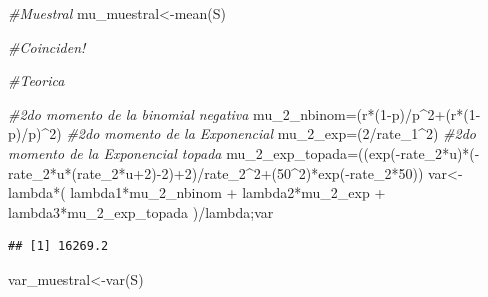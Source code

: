 \documentclass[
]{article}
\newenvironment{Shaded}{\begin{snugshade}}{\end{snugshade}}
\newcommand{\CommentTok}[1]{\textcolor[rgb]{0.56,0.35,0.01}{\textit{#1}}}
\newcommand{\DecValTok}[1]{\textcolor[rgb]{0.00,0.00,0.81}{#1}}
\newcommand{\FunctionTok}[1]{\textcolor[rgb]{0.00,0.00,0.00}{#1}}
\newcommand{\NormalTok}[1]{#1}
\newcommand{\OtherTok}[1]{\textcolor[rgb]{0.56,0.35,0.01}{#1}}
\newcommand{\SpecialCharTok}[1]{\textcolor[rgb]{0.00,0.00,0.00}{#1}}
\begin{document}
\begin{Shaded}
\begin{Highlighting}[]
\CommentTok{\#Muestral}
\NormalTok{mu\_muestral}\OtherTok{\textless{}{-}}\FunctionTok{mean}\NormalTok{(S)}

\CommentTok{\#Coinciden!}

\CommentTok{\#Teorica }

\CommentTok{\#2do momento de la binomial negativa}
\NormalTok{mu\_2\_nbinom}\OtherTok{=}\NormalTok{(r}\SpecialCharTok{*}\NormalTok{(}\DecValTok{1}\SpecialCharTok{{-}}\NormalTok{p)}\SpecialCharTok{/}\NormalTok{p}\SpecialCharTok{\^{}}\DecValTok{2}\SpecialCharTok{+}\NormalTok{(r}\SpecialCharTok{*}\NormalTok{(}\DecValTok{1}\SpecialCharTok{{-}}\NormalTok{p)}\SpecialCharTok{/}\NormalTok{p)}\SpecialCharTok{\^{}}\DecValTok{2}\NormalTok{)}
\CommentTok{\#2do momento de la Exponencial}
\NormalTok{mu\_2\_exp}\OtherTok{=}\NormalTok{(}\DecValTok{2}\SpecialCharTok{/}\NormalTok{rate\_1}\SpecialCharTok{\^{}}\DecValTok{2}\NormalTok{)}
\CommentTok{\#2do momento de la Exponencial topada}
\NormalTok{mu\_2\_exp\_topada}\OtherTok{=}\NormalTok{((}\FunctionTok{exp}\NormalTok{(}\SpecialCharTok{{-}}\NormalTok{rate\_2}\SpecialCharTok{*}\NormalTok{u)}\SpecialCharTok{*}\NormalTok{(}\SpecialCharTok{{-}}\NormalTok{rate\_2}\SpecialCharTok{*}\NormalTok{u}\SpecialCharTok{*}\NormalTok{(rate\_2}\SpecialCharTok{*}\NormalTok{u}\SpecialCharTok{+}\DecValTok{2}\NormalTok{)}\SpecialCharTok{{-}}\DecValTok{2}\NormalTok{)}\SpecialCharTok{+}\DecValTok{2}\NormalTok{)}\SpecialCharTok{/}\NormalTok{rate\_2}\SpecialCharTok{\^{}}\DecValTok{2}\SpecialCharTok{+}\NormalTok{(}\DecValTok{50}\SpecialCharTok{\^{}}\DecValTok{2}\NormalTok{)}\SpecialCharTok{*}\FunctionTok{exp}\NormalTok{(}\SpecialCharTok{{-}}\NormalTok{rate\_2}\SpecialCharTok{*}\DecValTok{50}\NormalTok{))}
\NormalTok{var}\OtherTok{\textless{}{-}}\NormalTok{lambda}\SpecialCharTok{*}\NormalTok{(}
\NormalTok{        lambda1}\SpecialCharTok{*}\NormalTok{mu\_2\_nbinom }\SpecialCharTok{+} 
\NormalTok{        lambda2}\SpecialCharTok{*}\NormalTok{mu\_2\_exp }\SpecialCharTok{+}
\NormalTok{        lambda3}\SpecialCharTok{*}\NormalTok{mu\_2\_exp\_topada}
\NormalTok{        )}\SpecialCharTok{/}\NormalTok{lambda;var}
\end{Highlighting}
\end{Shaded}

\begin{verbatim}
## [1] 16269.2
\end{verbatim}

\begin{Shaded}
\begin{Highlighting}[]
\NormalTok{var\_muestral}\OtherTok{\textless{}{-}}\FunctionTok{var}\NormalTok{(S)}
\end{Highlighting}
\end{Shaded}
\end{document}
